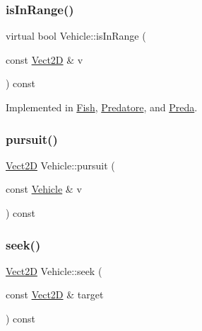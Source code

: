 \subsubsection{\texorpdfstring{is\+In\+Range()}{isInRange()}}
{\footnotesize\ttfamily virtual bool Vehicle\+::is\+In\+Range (\begin{DoxyParamCaption}\item[{const \hyperlink{classVect2D}{Vect2D} \&}]{v }\end{DoxyParamCaption}) const\hspace{0.3cm}{\ttfamily [pure virtual]}}



Implemented in \hyperlink{classFish_a65e3b0bf5b211be6c4048aa5939331e1_a65e3b0bf5b211be6c4048aa5939331e1}{Fish}, \hyperlink{classPredatore_ab7cd03e843432d25ba88348a9733a186_ab7cd03e843432d25ba88348a9733a186}{Predatore}, and \hyperlink{classPreda_a4014c320e53abbfc7cbfb30f18791db2_a4014c320e53abbfc7cbfb30f18791db2}{Preda}.

\mbox{\label{classVehicle_a9dd4f4a06b4abd3324d317c27bb867d2_a9dd4f4a06b4abd3324d317c27bb867d2}} 
\subsubsection{\texorpdfstring{pursuit()}{pursuit()}}
{\footnotesize\ttfamily \hyperlink{classVect2D}{Vect2D} Vehicle\+::pursuit (\begin{DoxyParamCaption}\item[{const \hyperlink{classVehicle}{Vehicle} \&}]{v }\end{DoxyParamCaption}) const}

\mbox{\label{classVehicle_a86c0b5ddcf64443bc090657cd29832bf_a86c0b5ddcf64443bc090657cd29832bf}} 
\subsubsection{\texorpdfstring{seek()}{seek()}}
{\footnotesize\ttfamily \hyperlink{classVect2D}{Vect2D} Vehicle\+::seek (\begin{DoxyParamCaption}\item[{const \hyperlink{classVect2D}{Vect2D} \&}]{target }\end{DoxyParamCaption}) const}

